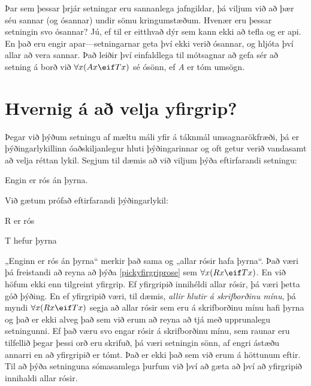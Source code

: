 Þar sem þessar þrjár setningar eru sannanlega jafngildar, þá viljum við að þær séu sannar (og ósannar) undir sömu kringumstæðum. Hvenær eru þessar setningin svo ósannar? Jú, ef til er eitthvað dýr sem kann ekki að tefla og er api. En það eru engir apar---setningarnar geta því ekki verið ósannar, og hljóta því allar að vera sannar. Það leiðir því einfaldlega til mótsagnar að gefa sér að setning á borð við $\forall x(Ax \eif Tx)$ sé ósönn, ef \emph{A} er tóm umsögn.



\section{Hvernig á að velja yfirgrip?}

Þegar við þýðum setningu af mæltu máli yfir á táknmál umsagnarökfræði, þá er þýðingarlykillinn óaðskiljanlegur hluti þýðingarinnar og oft getur verið vandasamt að velja réttan lykil. Segjum til dæmis að við viljum þýða eftirfarandi setningu: 
	\begin{earg}
		\item[\ex{pickyfirgriprose}] Engin er rós án þyrna.
	\end{earg}
Við gætum prófað eftirfarandi þýðingarlykil:
	\begin{ekey}
		\item[R]  er rós
		\item[T]  hefur þyrna
	\end{ekey}
„Enginn er rós án þyrna“ merkir það sama og „allar rósir hafa þyrna“. Það væri þá freistandi að reyna að þýða \ref{pickyfirgriprose} sem $\forall x(Rx \eif Tx)$. En við höfum ekki enn tilgreint yfirgrip. Ef yfirgripið innihéldi allar rósir, þá væri þetta góð þýðing. En ef yfirgripið væri, til dæmis, \emph{allir hlutir á skrifborðinu mínu}, þá myndi $\forall x(Rx \eif Tx)$ segja að allar rósir sem eru á skrifborðinu mínu hafi þyrna og það er ekki alveg það sem við erum að reyna að tjá með upprunalegu setningunni. Ef það væru svo engar rósir á skrifborðinu mínu, sem raunar eru tilfellið þegar þessi orð eru skrifuð, þá væri setningin sönn, af engri ástæðu annarri en að yfirgripið er tómt. Það er ekki það sem við erum á höttunum eftir. Til að þýða setninguna sómasamlega þurfum við því að gæta að því að yfirgripið innihaldi allar rósir.

